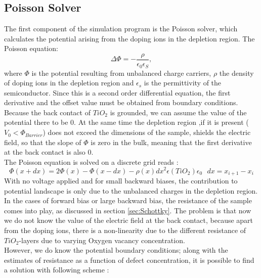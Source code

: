 \documentclass[12pt]{article}
\begin{document}
\subsection{Poisson Solver}
	The first component of the simulation program is the Poisson solver, which calculates the potential arising from the doping ions in the depletion region. The Poisson equation:
	\begin{equation}
	\Delta\Phi = - \frac{\rho}{\epsilon _0\epsilon_S},
	\end{equation}
	where $\Phi$ is the potential resulting from unbalanced charge carriers, $\rho$ the density of doping ions in the depletion region and $\epsilon_s$ is the permittivity of the semiconductor. Since this is a second order differential equation, the first derivative and the offset value must be obtained from boundary conditions. Because the back contact of $TiO_2$ is grounded, we can assume the value of the potential there to be 0. At the same time the depletion region ,if it is present ($V_0<\Phi_{Barrier}$) does not exceed the dimensions of the sample, shields the electric field, so that the slope of $\Phi$ is zero in the bulk, meaning that the first derivative at the back contact is also 0.\\
	The Poisson equation is solved on a discrete grid reads :
	\begin{equation}
		\Phi(x+dx) = 2\Phi(x) - \Phi(x-dx) - \rho(x) dx^2 \epsilon(TiO_2) \epsilon_0  \ \ \ dx = x_{i+1} - x_i
	\end{equation}
	With no voltage applied and for small backward biases, the contribution to potential landscape is only due to the unbalanced charges in the depletion region. In the cases of forward bias or large backward bias, the resistance of the sample comes into play, as discussed in section \ref{sec:Schottky}. The problem is that now we do not know the value of the electric field at the back contact, because apart from the doping ions, there is a non-linearity due to the different resistance of $TiO_2$-layers due to varying Oxygen vacancy concentration.\\
	However, we do know the potential boundary conditions; along with the estimates of resistance as a function of defect concentration, it is possible to find a solution with following scheme : %
	
	
	
\end{document}
